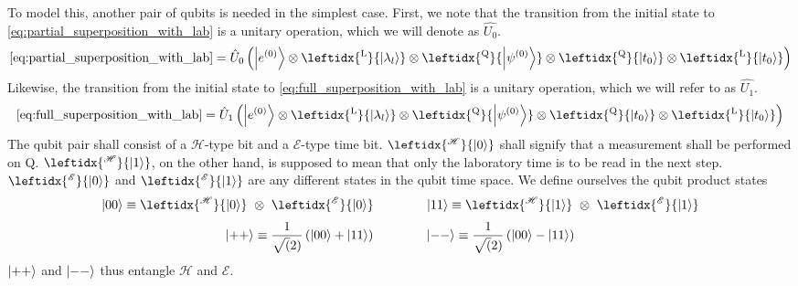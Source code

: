 \documentclass[12pt]{article}
\begin{document}
To model this, another pair of qubits is needed in the simplest case. First, we note that the transition from the initial state to \eqref{eq:partial_superposition_with_lab} is a unitary operation, which we will denote as $\hat{U_0}$.
\begin{equation}
\eqref{eq:partial_superposition_with_lab} = \hat{U}_0
\left(
\ket{e^{(0)}} 
\otimes \leftidx{^\mathrm{L}}{\ket{\lambda_l}} 
\otimes \leftidx{^\mathrm{Q}}{\ket{\psi^{(0)}}}
\otimes \leftidx{^\mathrm{Q}}{\ket{t_0}}
\otimes \leftidx{^\mathrm{L}}{\ket{t_0}}
\right)
\end{equation} 
Likewise, the transition from the initial state to \eqref{eq:full_superposition_with_lab} is a unitary operation, which we will refer to as $\hat{U_1}$.
\begin{equation}
\eqref{eq:full_superposition_with_lab} = \hat{U}_1
\left(
\ket{e^{(0)}} 
\otimes \leftidx{^\mathrm{L}}{\ket{\lambda_l}} 
\otimes \leftidx{^\mathrm{Q}}{\ket{\psi^{(0)}}}
\otimes \leftidx{^\mathrm{Q}}{\ket{t_0}}
\otimes \leftidx{^\mathrm{L}}{\ket{t_0}}
\right)
\end{equation} 
The qubit pair shall consist of a $\mathscr{H}$-type bit and a $\mathscr{E}$-type time bit. $\leftidx{^\mathscr{H}}{\ket{0}}$ shall signify that a measurement shall be performed on Q. $\leftidx{^\mathscr{H}}{\ket{1}}$, on the other hand, is supposed to mean that only the laboratory time is to be read in the next step. $\leftidx{^\mathscr{E}}{\ket{0}}$ and $\leftidx{^\mathscr{E}}{\ket{1}}$ are any different states in the qubit time space. We define ourselves the qubit product states
\begin{equation*}
\ket{00} \equiv \leftidx{^\mathscr{H}}{\ket{0}}\ \otimes\ \leftidx{^\mathscr{E}}{\ket{0}}
\quad\quad\quad\quad
\ket{11} \equiv \leftidx{^\mathscr{H}}{\ket{1}}\ \otimes\ \leftidx{^\mathscr{E}}{\ket{1}}
\end{equation*}
\begin{equation*}
\ket{++} \equiv \frac{1}{\sqrt(2)}\left(\ket{00}+\ket{11}\right)
\quad\quad\quad\quad
\ket{--} \equiv \frac{1}{\sqrt(2)}\left(\ket{00}-\ket{11}\right)
\end{equation*}
$\ket{++}$ and $\ket{--}$ thus entangle $\mathscr{H}$ and $\mathscr{E}$.
\end{document}
